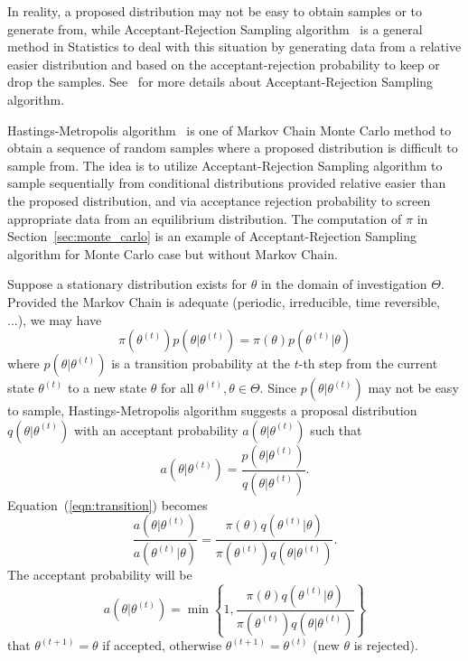 In reality, a proposed distribution may not be easy to obtain samples or
to generate from, while Acceptant-Rejection Sampling
algorithm~ is a general method
in Statistics to deal with this situation by generating data from a relative
easier distribution and based on the acceptant-rejection probability to keep or
drop the samples. See~\citet{Ross1996} for more details about
Acceptant-Rejection Sampling algorithm.

Hastings-Metropolis algorithm~\citep{Hastings1970,Metropolis1953}
is one of Markov Chain Monte Carlo method to obtain
a sequence of random samples where a proposed distribution is difficult to
sample from. The idea is to utilize Acceptant-Rejection Sampling algorithm
to sample sequentially from conditional distributions provided relative
easier than the proposed distribution, and via acceptance rejection
probability to screen appropriate data from an equilibrium distribution.
The computation of $\pi$ in Section~\ref{sec:monte_carlo}
is an example of Acceptant-Rejection Sampling algorithm for
Monte Carlo case but without Markov Chain.

Suppose a stationary distribution exists for $\theta$ in the domain of
investigation $\Theta$. Provided the Markov Chain is adequate
(periodic, irreducible, time reversible, ...), we may have
\begin{equation}
\pi(\theta^{(t)}) p(\theta | \theta^{(t)}) =
\pi(\theta) p(\theta^{(t)} | \theta)
\label{eqn:transition}
\end{equation}
where $p(\theta | \theta^{(t)})$ is a transition probability at the $t$-th step
from the current state $\theta^{(t)}$ to a new state $\theta$ for all
$\theta^{(t)}, \theta \in \Theta$.
Since $p(\theta | \theta^{(t)})$ may not be easy to sample, Hastings-Metropolis
algorithm suggests a proposal distribution $q(\theta | \theta^{(t)})$ with an
acceptant probability $a(\theta | \theta^{(t)})$ such that
\begin{equation}
a(\theta | \theta^{(t)}) =
\frac{p(\theta | \theta^{(t)})}{q(\theta | \theta^{(t)})}.
\label{eqn:accpetance}
\end{equation}
Equation~(\ref{eqn:transition}) becomes
\begin{equation}
\frac{a(\theta | \theta^{(t)})}{a(\theta^{(t)} | \theta)}
=
\frac{\pi(\theta) q(\theta^{(t)} | \theta)}{\pi(\theta^{(t)}) q(\theta | \theta^{(t)})}.
\label{eqn:acceptant_rejection}
\end{equation}
The acceptant probability will be
\begin{equation}
a(\theta | \theta^{(t)}) = \min \left\{
1,
\frac{\pi(\theta) q(\theta^{(t)} | \theta)}{
      \pi(\theta^{(t)}) q(\theta | \theta^{(t)})}
\right\}
\label{eqn:acceptant_probability}
\end{equation}
that
$\theta^{(t+1)} = \theta$ if accepted, otherwise
$\theta^{(t+1)} = \theta^{(t)}$ (new $\theta$ is rejected).

